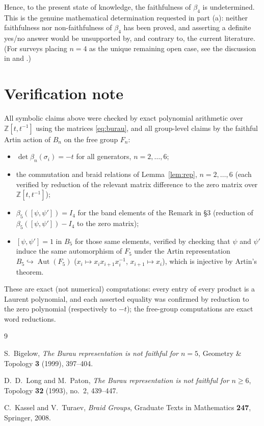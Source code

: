 \documentclass{amsart}
\theoremstyle{remark}
\begin{document}
Hence, to the present state of knowledge, the faithfulness of $\beta_4$ is
undetermined. This is the genuine mathematical determination requested in part
(a): neither faithfulness nor non-faithfulness of $\beta_4$ has been proved, and
asserting a definite yes/no answer would be unsupported by, and contrary to, the
current literature. (For surveys placing $n=4$ as the unique remaining open
case, see the discussion in \cite{Bigelow1999} and \cite{KasselTuraev}.)

\section{Verification note}

All symbolic claims above were checked by exact polynomial arithmetic over
$\mathbb Z[t,t^{-1}]$ using the matrices \eqref{eq:burau}, and all group-level
claims by the faithful Artin action of $B_n$ on the free group $F_n$:
\begin{itemize}
\item $\det\beta_n(\sigma_i)=-t$ for all generators, $n=2,\dots,6$;
\item the commutation and braid relations of Lemma~\ref{lem:rep}, $n=2,\dots,6$
(each verified by reduction of the relevant matrix difference to the zero
matrix over $\mathbb Z[t,t^{-1}]$);
\item $\beta_5([\psi,\psi'])=I_4$ for the band elements of the Remark in \S3
(reduction of $\beta_5([\psi,\psi'])-I_4$ to the zero matrix);
\item $[\psi,\psi']=1$ in $B_5$ for those same elements, verified by checking
that $\psi$ and $\psi'$ induce the same automorphism of $F_5$ under the Artin
representation $B_5\hookrightarrow\operatorname{Aut}(F_5)$
($x_i\mapsto x_ix_{i+1}x_i^{-1}$, $x_{i+1}\mapsto x_i$), which is injective by
Artin's theorem.
\end{itemize}
These are exact (not numerical) computations: every entry of every product is a
Laurent polynomial, and each asserted equality was confirmed by reduction to the
zero polynomial (respectively to $-t$); the free-group computations are exact
word reductions.

\begin{thebibliography}{9}

S.~Bigelow,
\emph{The Burau representation is not faithful for $n=5$},
Geometry \& Topology \textbf{3} (1999), 397--404.

D.~D.~Long and M.~Paton,
\emph{The Burau representation is not faithful for $n\ge6$},
Topology \textbf{32} (1993), no.~2, 439--447.

C.~Kassel and V.~Turaev,
\emph{Braid Groups},
Graduate Texts in Mathematics \textbf{247}, Springer, 2008.

\end{thebibliography}
\end{document}
